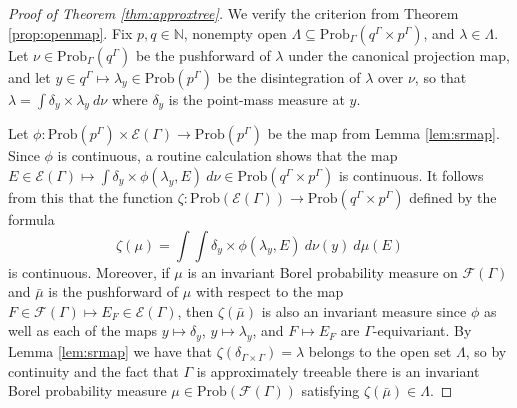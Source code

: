 \documentclass[12pt]{amsart}
\theoremstyle{definition}
\def\cal{\mathcal}
\newcommand\bN{{\mathbb N}}
\newcommand{\Prob}{\mathrm{Prob}}
\begin{document}
\begin{proof}[Proof of Theorem \ref{thm:approxtree}]
	We verify the criterion from Theorem \ref{prop:openmap}. Fix $p,q\in \bN$, nonempty open $\Lambda \subseteq \Prob_\Gamma(q^\Gamma \times p^\Gamma)$, and $\lambda \in \Lambda$. Let $\nu \in \Prob_\Gamma(q^\Gamma)$ be the pushforward of $\lambda$ under the canonical projection map, and let $y \in q^\Gamma \mapsto \lambda_y \in \Prob(p^\Gamma)$ be the disintegration of $\lambda$ over $\nu$, so that $\lambda = \int \delta_y \times \lambda_y \ d \nu$ where $\delta_y$ is the point-mass measure at $y$.
	
	Let $\phi : \Prob(p^\Gamma) \times \cal E(\Gamma) \rightarrow \Prob(p^\Gamma)$ be the map from Lemma \ref{lem:srmap}. Since $\phi$ is continuous, a routine calculation shows that the map $E \in \cal E(\Gamma) \mapsto \int \delta_y \times \phi(\lambda_y, E) \ d \nu \in \Prob(q^\Gamma \times p^\Gamma)$ is continuous. It follows from this that the function $\zeta : \Prob(\cal E(\Gamma)) \rightarrow \Prob(q^\Gamma \times p^\Gamma)$ defined by the formula
	\[\zeta(\mu) = \int \int \delta_y \times \phi(\lambda_y, E) \ d \nu(y) \ d \mu(E)\]
	is continuous. Moreover, if $\mu$ is an invariant Borel probability measure on $\cal F(\Gamma)$ and $\bar \mu$ is the pushforward of $\mu$ with respect to the map $F \in \cal F(\Gamma) \mapsto E_F \in \cal E(\Gamma)$, then $\zeta(\bar \mu)$ is also an invariant measure since $\phi$ as well as each of the maps $y \mapsto \delta_y$, $y \mapsto \lambda_y$, and $F \mapsto E_F$ are $\Gamma$-equivariant. By Lemma \ref{lem:srmap} we have that $\zeta(\delta_{\Gamma \times \Gamma}) = \lambda$ belongs to the open set $\Lambda$, so by continuity and the fact that $\Gamma$ is approximately treeable there is an invariant Borel probability measure $\mu \in \Prob(\cal F(\Gamma))$ satisfying $\zeta(\bar \mu) \in \Lambda$.
	

\end{proof}
\end{document}
